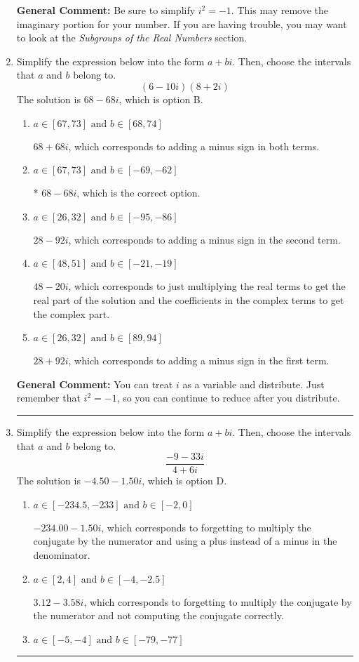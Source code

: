 \documentclass{extbook}[14pt]
\newcommand{\litem}[1]{\item #1

\rule{\textwidth}{0.4pt}}
\begin{document}
\begin{enumerate}
{\textbf{General Comment:} Be sure to simplify $i^2 = -1$. This may remove the imaginary portion for your number. If you are having trouble, you may want to look at the \textit{Subgroups of the Real Numbers} section.
}
\litem{
Simplify the expression below into the form $a+bi$. Then, choose the intervals that $a$ and $b$ belong to.
\[ (6 - 10 i)(8 + 2 i) \]The solution is \( 68 - 68 i \), which is option B.\begin{enumerate}[label=\Alph*.]
\item \( a \in [67, 73] \text{ and } b \in [68, 74] \)

 $68 + 68 i$, which corresponds to adding a minus sign in both terms.
\item \( a \in [67, 73] \text{ and } b \in [-69, -62] \)

* $68 - 68 i$, which is the correct option.
\item \( a \in [26, 32] \text{ and } b \in [-95, -86] \)

 $28 - 92 i$, which corresponds to adding a minus sign in the second term.
\item \( a \in [48, 51] \text{ and } b \in [-21, -19] \)

 $48 - 20 i$, which corresponds to just multiplying the real terms to get the real part of the solution and the coefficients in the complex terms to get the complex part.
\item \( a \in [26, 32] \text{ and } b \in [89, 94] \)

 $28 + 92 i$, which corresponds to adding a minus sign in the first term.
\end{enumerate}

\textbf{General Comment:} You can treat $i$ as a variable and distribute. Just remember that $i^2=-1$, so you can continue to reduce after you distribute.
}
\litem{
Simplify the expression below into the form $a+bi$. Then, choose the intervals that $a$ and $b$ belong to.
\[ \frac{-9 - 33 i}{4 + 6 i} \]The solution is \( -4.50  - 1.50 i \), which is option D.\begin{enumerate}[label=\Alph*.]
\item \( a \in [-234.5, -233] \text{ and } b \in [-2, 0] \)

 $-234.00  - 1.50 i$, which corresponds to forgetting to multiply the conjugate by the numerator and using a plus instead of a minus in the denominator.
\item \( a \in [2, 4] \text{ and } b \in [-4, -2.5] \)

 $3.12  - 3.58 i$, which corresponds to forgetting to multiply the conjugate by the numerator and not computing the conjugate correctly.
\item \( a \in [-5, -4] \text{ and } b \in [-79, -77] \)


\end{enumerate}}
\end{enumerate}
\end{document}
